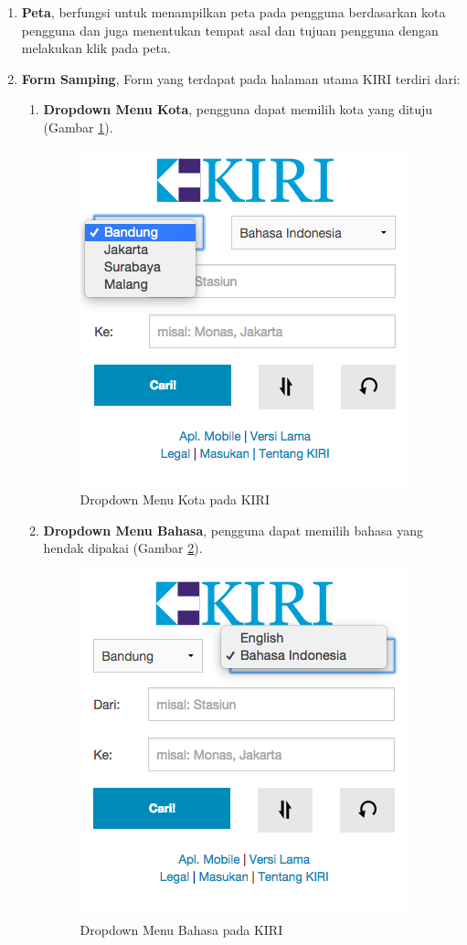 \begin{enumerate}
	\item \textbf{Peta}, berfungsi untuk menampilkan peta pada pengguna berdasarkan kota pengguna dan juga menentukan tempat asal dan tujuan pengguna dengan melakukan klik pada peta.
	\item \textbf{Form Samping},
	Form yang terdapat pada halaman utama KIRI terdiri dari:
		\begin{enumerate}
			\item \textbf{Dropdown Menu Kota}, pengguna dapat memilih kota yang dituju (Gambar \ref{fig:3_KIRI_drop_kota}).
			\begin{figure}[H]
				\centering
				\includegraphics[scale=0.5]{Gambar/KIRI-drop-kota}
				\caption{Dropdown Menu Kota pada KIRI} 
				\label{fig:3_KIRI_drop_kota}
			\end{figure}
			
			\item \textbf{Dropdown Menu Bahasa}, pengguna dapat memilih bahasa yang hendak dipakai (Gambar \ref{fig:3_KIRI_drop_bahasa}).
			\begin{figure}[H]
				\centering
				\includegraphics[scale=0.5]{Gambar/KIRI-drop-bahasa}
				\caption{Dropdown Menu Bahasa pada KIRI} 
				\label{fig:3_KIRI_drop_bahasa}
			\end{figure}
			

\end{enumerate}
\end{enumerate}
